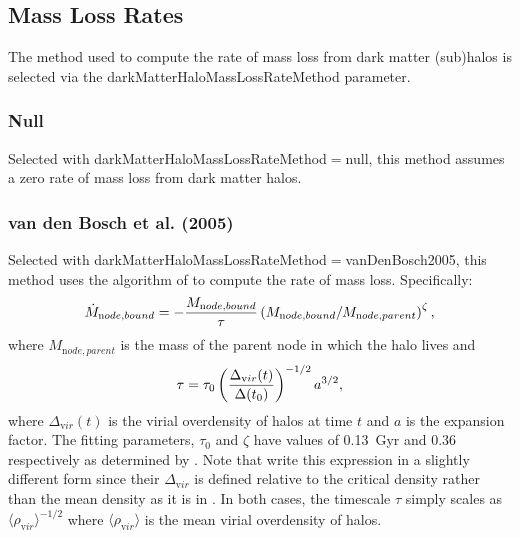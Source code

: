 \subsection{Mass Loss Rates}

The method used to compute the rate of mass loss from dark matter (sub)halos is selected via the {\normalfont \ttfamily darkMatterHaloMassLossRateMethod} parameter.

\subsubsection{Null}

Selected with {\normalfont \ttfamily darkMatterHaloMassLossRateMethod}$=${\normalfont \ttfamily null}, this method assumes a zero rate of mass loss from dark matter halos.

\subsubsection{van den Bosch et al. (2005)}

Selected with {\normalfont \ttfamily darkMatterHaloMassLossRateMethod}$=${\normalfont \ttfamily vanDenBosch2005}, this method uses the algorithm of \cite{van_den_bosch_mass_2005} to compute the rate of mass loss. Specifically:
\begin{equation}
\dot{M}_{\mathrm node,bound} = -{M_{\mathrm node,bound}\over \tau} \left({M_{\mathrm node,bound} / M_{\mathrm node,parent}}\right)^\zeta,
\end{equation}
where $M_{\mathrm node,parent}$ is the mass of the parent \gls{node} in which the halo lives and
\begin{equation}
\tau = \tau_0 \left({\Delta_{\mathrm vir}(t) \over \Delta(t_0)}\right)^{-1/2} a^{3/2},
\end{equation}
where $\Delta_{\mathrm vir}(t)$ is the virial overdensity of halos at time $t$ and $a$ is the expansion factor. The fitting parameters, $\tau_0$ and $\zeta$ have values of 0.13~Gyr and 0.36 respectively as determined by \cite{van_den_bosch_mass_2005}. Note that  \cite{van_den_bosch_mass_2005} write this expression in a slightly different form since their $\Delta_{\mathrm vir}$ is defined relative to the critical density rather than the mean density as it is in \glc. In both cases, the timescale $\tau$ simply scales as $\langle \rho_{\mathrm vir} \rangle ^{-1/2}$ where $\langle \rho_{\mathrm vir} \rangle$ is the mean virial overdensity of halos.

